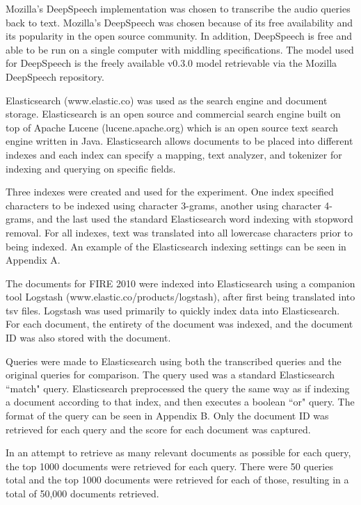 \documentclass[jair, twoside,11pt,theapa]{article}
\begin{document}
Mozilla's DeepSpeech implementation was chosen to transcribe the audio queries back to text. Mozilla's DeepSpeech was chosen because of its free availability and its popularity in the open source community. In addition, DeepSpeech is free and able to be run on a single computer with middling specifications. The model used for DeepSpeech is the freely available v0.3.0 model retrievable via the Mozilla DeepSpeech repository.

Elasticsearch (www.elastic.co) was used as the search engine and document storage. Elasticsearch is an open source and commercial search engine built on top of Apache Lucene (lucene.apache.org) which is an open source text search engine written in Java. Elasticsearch allows documents to be placed into different indexes and each index can specify a mapping, text analyzer, and tokenizer for indexing and querying on specific fields. 

Three indexes were created and used for the experiment. One index specified characters to be indexed using character 3-grams, another using character 4-grams, and the last used the standard Elasticsearch word indexing with stopword removal. For all indexes, text was translated into all lowercase characters prior to being indexed. An example of the Elasticsearch indexing settings can be seen in Appendix A. 

The documents for FIRE 2010 were indexed into Elasticsearch using a companion tool Logstash (www.elastic.co/products/logstash), after first being translated into tsv files. Logstash was used primarily to quickly index data into Elasticsearch. For each document, the entirety of the document was indexed, and the document ID was also stored with the document. 

Queries were made to Elasticsearch using both the transcribed queries and the original queries for comparison. The query used was a standard Elasticsearch ``match" query. Elasticsearch preprocessed the query the same way as if indexing a document according to that index, and then executes a boolean ``or" query. The format of the query can be seen in Appendix B. Only the document ID was retrieved for each query and the score for each document was captured. 

In an attempt to retrieve as many relevant documents as possible for each query, the top 1000 documents were retrieved for each query. There were 50 queries total and the top 1000 documents were retrieved for each of those, resulting in a total of 50,000 documents retrieved. 
\end{document}

